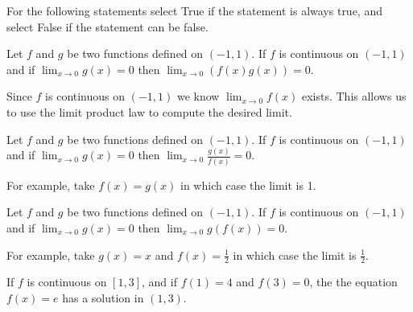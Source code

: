 \documentclass{ximera}
\author{Nela Lakos \and Kyle Parsons}
\begin{document}
\begin{exercise}

For the following statements select True if the statement is always true, and select False if the statement can be false.

Let $f$ and $g$ be two functions defined on $\left(-1,1\right)$. If $f$ is continuous on $\left(-1,1\right)$ and if $\lim_{x\to0}g(x)=0$ then $\lim_{x\to0}\left(f(x)g(x)\right) = 0$.

\begin{multipleChoice}
\end{multipleChoice}

\begin{feedback}
Since $f$ is continuous on $\left(-1,1\right)$ we know $\lim_{x\to0}f(x)$ exists.  This allows us to use the limit product law to compute the desired limit.
\end{feedback}

\begin{exercise}

Let $f$ and $g$ be two functions defined on $\left(-1,1\right)$. If $f$ is continuous on $\left(-1,1\right)$ and if $\lim_{x\to0}g(x)=0$ then $\lim_{x\to0}\frac{g(x)}{f(x)} = 0$.

\begin{multipleChoice}
\end{multipleChoice}

\begin{feedback}
For example, take $f(x)=g(x)$ in which case the limit is 1.
\end{feedback}

\begin{exercise}

Let $f$ and $g$ be two functions defined on $\left(-1,1\right)$. If $f$ is continuous on $\left(-1,1\right)$ and if $\lim_{x\to0}g(x)=0$ then $\lim_{x\to0}g(f(x)) = 0$.

\begin{multipleChoice}
\end{multipleChoice}

\begin{feedback}
For example, take $g(x) = x$ and $f(x) = \frac{1}{2}$ in which case the limit is $\frac{1}{2}$.
\end{feedback}

\begin{exercise}

If $f$ is continuous on $\left[1,3\right]$, and if $f(1) = 4$ and $f(3) = 0$, the the equation $f(x) = e$ has a solution in $\left(1,3\right)$.


\end{exercise}
\end{exercise}
\end{exercise}
\end{exercise}
\end{document}
